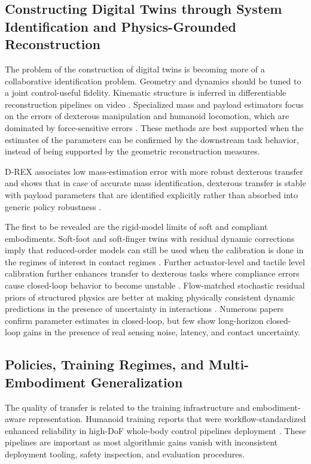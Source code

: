 \documentclass[11pt,a4paper]{article}
\begin{document}
\subsection{Constructing Digital Twins through System Identification and Physics-Grounded Reconstruction}

The problem of the construction of digital twins is becoming more of a collaborative identification problem. Geometry and dynamics should be tuned to a joint control-useful fidelity. Kinematic structure is inferred in differentiable reconstruction pipelines on video \cite{heiden2022inferring}. Specialized mass and payload estimators focus on the errors of dexterous manipulation and humanoid locomotion, which are dominated by force-sensitive errors \cite{lou2026drex}. These methods are best supported when the estimates of the parameters can be confirmed by the downstream task behavior, instead of being supported by the geometric reconstruction measures.

D-REX associates low mass-estimation error with more robust dexterous transfer and shows that in case of accurate mass identification, dexterous transfer is stable with payload parameters that are identified explicitly rather than absorbed into generic policy robustness \cite{lou2026drex}.

The first to be revealed are the rigid-model limits of soft and compliant embodiments. Soft-foot and soft-finger twins with residual dynamic corrections imply that reduced-order models can still be used when the calibration is done in the regimes of interest in contact regimes \cite{crotti2024softfoot,ma2025softmap,cho2025rafl}. Further actuator-level and tactile level calibration further enhances transfer to dexterous tasks where compliance errors cause closed-loop behavior to become unstable \cite{bytedance2025closing}. Flow-matched stochastic residual priors of structured physics are better at making physically consistent dynamic predictions in the presence of uncertainty in interactions \cite{kotecha2026stride}. Numerous papers confirm parameter estimates in closed-loop, but few show long-horizon closed-loop gains in the presence of real sensing noise, latency, and contact uncertainty.

\subsection{Policies, Training Regimes, and Multi-Embodiment Generalization}

The quality of transfer is related to the training infrastructure and embodiment-aware representation. Humanoid training reports that were workflow-standardized enhanced reliability in high-DoF whole-body control pipelines deployment \cite{zhao2026agile}. These pipelines are important as most algorithmic gains vanish with inconsistent deployment tooling, safety inspection, and evaluation procedures.
\end{document}
